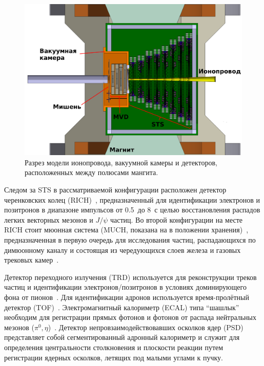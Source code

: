 \begin{figure}[H]
\includegraphics[width=1.0\textwidth]{pictures/CBM_vacuum_chamber_model.png}
\caption{Разрез модели ионопровода, вакуумной камеры и детекторов, расположенных между полюсами мангита.}
\label{fig:InMagnetBox}
\end{figure}

Следом за STS в рассматриваемой конфигурации расположен детектор черенковских колец (RICH)~\cite{TDR_RICH}, предназначенный для идентификации электронов и позитронов в диапазоне импульсов от 0.5~\GeVoverC до 8~\GeVoverC с целью восстановления распадов легких векторных мезонов и $ J / \psi $ частиц. Во второй конфигурации на месте RICH стоит мюонная система (MUCH, показана на  в положении хранения)~\cite{TDR_MUCH}, предназначенная в первую очередь для исследования частиц, распадающихся по димюонному каналу и состоящая из чередующихся слоев железа и газовых трековых камер~\cite{GEM}.

Детектор переходного излучения (TRD) используется для реконструкции треков частиц и идентификации электронов/позитронов в условиях доминирующего фона от пионов~\cite{TRD}. Для идентификации адронов используется время-пролётный детектор (TOF)~\cite{TDR_TOF}. Электромагнитный калориметр (ECAL) типа ``шашлык'' необходим для регистрации прямых фотонов и фотонов от распада нейтральных мезонов ($ \pi^{0}, \eta $)~\cite{ECAL_KOROLKO}. Детектор непровзаимодействовавших осколков ядер (PSD)~\cite{TDR_PSD} представляет собой сегментированный адронный калориметр и служит для определения центральности столкновения и плоскости реакции путем регистрации ядерных осколков, летящих под малыми углами к пучку.


